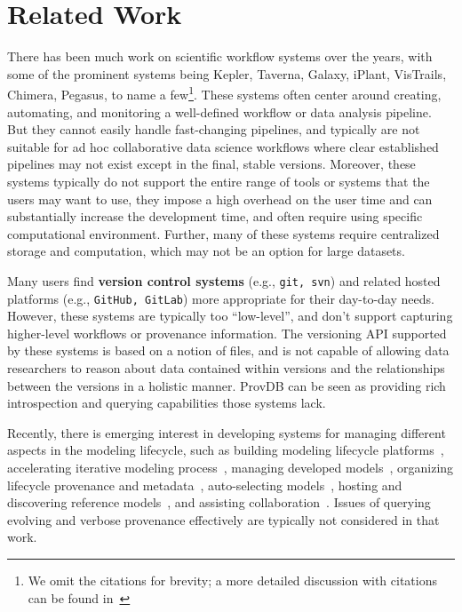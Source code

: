 \documentclass[11pt]{article}
\newcommand{\provdb}{{\sc ProvDB}\xspace}
\newcommand{\nosubcite}[1]{}
\begin{document}
\section{Related Work}
\label{sec:related}
There has been much work on scientific workflow systems over the years, with some of the prominent systems being Kepler\nosubcite{~\cite{ludascher2006scientific}},
Taverna\nosubcite{~\cite{oinn2006taverna}}, Galaxy\nosubcite{~\cite{giardine2005galaxy}}, iPlant\nosubcite{~\cite{goff2011iplant}},
VisTrails\nosubcite{~\cite{bavoil2005vistrails}}, Chimera\nosubcite{~\cite{foster2002chimera}}, Pegasus\nosubcite{~\cite{DBLP:journals/sp/DeelmanSSBGKMVBGLJK05}}, to name a 
few\footnote{We omit the citations for brevity; a more detailed discussion with citations can be found in~\cite{provdb@hilda17,provquery_long}}. 
These systems often center around creating, automating, and monitoring a well-defined workflow or data analysis pipeline. But they cannot easily handle fast-changing pipelines, and typically are not suitable for ad hoc collaborative data science workflows where clear established pipelines may not exist except in the final, stable versions. Moreover, these systems typically do not support the entire range of tools or systems that the users may want to use, they impose a high overhead on the user time and can substantially increase the development time, and often require using specific computational environment. Further, many of these systems require centralized storage and computation, which may not be an option for large datasets. 

Many users find {\bf version control systems} (e.g., {\tt git, svn}) and related hosted platforms (e.g., {\tt GitHub, GitLab}) more appropriate for their day-to-day
needs.  However, these systems are typically too ``low-level'', and don't support capturing higher-level workflows or provenance information. The versioning API
supported by these systems is based on a notion of files, and is not capable of allowing data researchers to reason about data contained within versions and the
relationships between the versions in a holistic manner. \provdb can be seen as providing rich introspection and querying capabilities those systems lack. 


Recently, there is emerging interest in developing systems for managing different aspects in the modeling lifecycle, such as building modeling lifecycle
platforms~\cite{google_tfx@kdd17}, accelerating iterative modeling process~\cite{columbus_tods16p}, managing developed models~\cite{modeldb_HILDA16p,modelhub@icde17},
organizing lifecycle provenance and metadata~\cite{ground@cidr17,provdb@hilda17,amazon_metadata@learningsys17},  auto-selecting
models~\cite{model_selection_arun_record15p}, hosting and discovering reference models~\cite{openml@kddexp13,discovery@deem17}, and assisting
collaboration~\cite{kandogan2015labbookp}.  Issues of querying evolving and verbose provenance effectively are typically not considered in that work.
\end{document}
